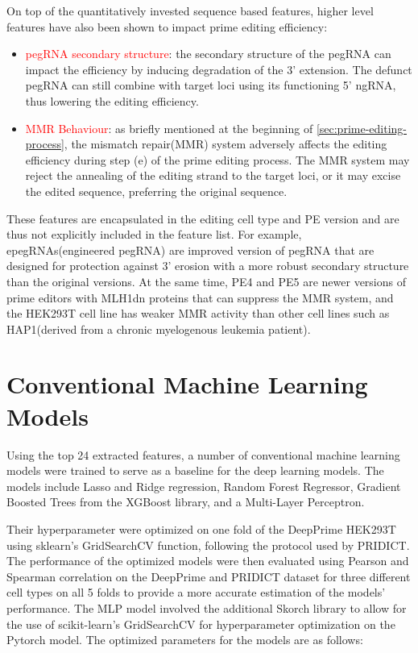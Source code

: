 On top of the quantitatively invested sequence based features, higher level features have also been shown to impact prime editing efficiency:
\begin{itemize}[itemsep=-0mm]
    \item \textcolor{red}{pegRNA secondary structure}: the secondary structure of the pegRNA can impact the efficiency by inducing degradation of the 3' extension. The defunct pegRNA can still combine with target loci using its functioning 5' ngRNA, thus lowering the editing efficiency\cite{nelsonEngineeredPegRNAsImprove2022}.
    \item \textcolor{red}{MMR Behaviour}: as briefly mentioned at the beginning of \autoref{sec:prime-editing-process}, the mismatch repair(MMR) system adversely affects the editing efficiency during step (e) of the prime editing process. The MMR system may reject the annealing of the editing strand to the target loci, or it may excise the edited sequence, preferring the original sequence\cite{chenEnhancedPrimeEditing2021}. 
\end{itemize}

These features are encapsulated in the editing cell type and PE version and are thus not explicitly included in the feature list. For example, epegRNAs(engineered pegRNA) are improved version of pegRNA that are designed for protection against 3' erosion with a more robust secondary structure than the original versions\cite{nelsonEngineeredPegRNAsImprove2022}. At the same time, PE4 and PE5 are newer versions of prime editors with MLH1dn proteins that can suppress the MMR system\cite{chenEnhancedPrimeEditing2021}, and the HEK293T cell line has weaker MMR activity than other cell lines such
as HAP1(derived from a chronic myelogenous leukemia patient)\cite{mathisPredictingPrimeEditing2023}. 


\section{Conventional Machine Learning Models}
\label{sec:conventional-ml}

Using the top 24 extracted features, a number of conventional machine learning models were trained to serve as a baseline for the deep learning models. The models include Lasso and Ridge regression, Random Forest Regressor, Gradient Boosted Trees from the XGBoost library, and a Multi-Layer Perceptron.

Their hyperparameter were optimized on one fold of the DeepPrime HEK293T using sklearn's GridSearchCV function, following the protocol used by PRIDICT. The performance of the optimized models were then evaluated using Pearson and Spearman correlation on the DeepPrime and PRIDICT dataset for three different cell types on all 5 folds to provide a more accurate estimation of the models' performance. The MLP model involved the additional Skorch library to allow for the use of scikit-learn's GridSearchCV for hyperparameter optimization on the Pytorch model. The optimized parameters for the models are as follows:

